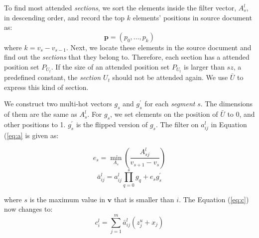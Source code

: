 To find most attended \textit{sections}, 
we sort the elements inside the filter vector, 
$A_{s}^{l}$, in descending order, 
and record the top $k$ elements' positions in 
source document as: 
\begin{equation}
    \mathbf{p}=(p_{0},...,p_{k})
\end{equation}
where $k = v_{s} - v_{s-1}$.
Next, we locate these elements in the source document and 
find out the \textit{sections} that they belong to. 
Therefore, each section has a attended position set $P_{U_{t}}$. 
If the size of an attended position set $P_{U_{t}}$ is larger than
$sz$, a predefined constant,
the \textit{section $U_{t}$} should not be attended again. 
We use $\bar{U}$ to express this kind of section. 

We construct two multi-hot vectors $g_{s}$ and $g^{'}_{s}$ for each \textit{segment} $s$.
The dimensions of them are the
same as $A_{s}^{l}$. For $g_{s}$, we set elements on the position of $\bar{U}$ to 0, and other
positions to 1. $g^{'}_{s}$ is the flipped version of $g_{s}$. 
The filter on $a_{ij}^{l}$ in Equation (\ref{eq:a} is given as:

\begin{equation}
    e_{s} = \min \limits_{A_{s}}\left(\frac{A_{sj}^{l}}{v_{s+1}-v_{s}}\right)
\end{equation}
\begin{equation}
    \bar{a}_{ij}^{l} = a_{ij}^{l}\prod_{q=0}^{s}g_{q} + e_{s}g^{'}_{s}
\end{equation}

where $s$ is the maximum value in 
$\mathbf{v}$ that is smaller than $i$.  
The Equation (\ref{eq:c}) now changes to:
\begin{equation}
    c _ { i } ^ { l } = \sum _ { j = 1 } ^ { m } \bar{a} _ { i j } ^ { l } \left( z _ { j } ^ { u } + x_j \right)
\end{equation}

